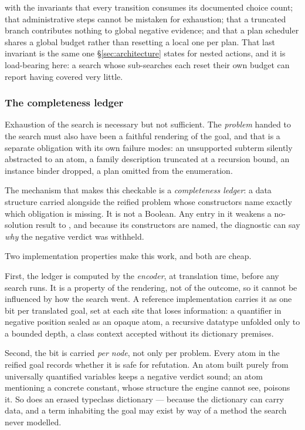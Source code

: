 with the invariants that every transition consumes its documented choice count;
that administrative steps cannot be mistaken for exhaustion; that a truncated
branch contributes nothing to global negative evidence; and that a plan
scheduler shares a global budget rather than resetting a local one per plan.
That last invariant is the same one \S\ref{sec:architecture} states for nested
actions, and it is load-bearing here: a search whose sub-searches each reset
their own budget can report  having covered very little.

\subsubsection*{The completeness ledger}

Exhaustion of the search is necessary but not sufficient. The \emph{problem}
handed to the search must also have been a faithful rendering of the goal, and
that is a separate obligation with its own failure modes: an unsupported
subterm silently abstracted to an atom, a family description truncated at a
recursion bound, an instance binder dropped, a plan omitted from the
enumeration.

The mechanism that makes this checkable is a \emph{completeness ledger}: a data
structure carried alongside the reified problem whose constructors name exactly
which obligation is missing. It is not a Boolean. Any entry in it weakens a
no-solution result to \unknown{}, and because its constructors are named, the
diagnostic can say \emph{why} the negative verdict was withheld.

Two implementation properties make this work, and both are cheap.

First, the ledger is computed by the \emph{encoder}, at translation time,
before any search runs. It is a property of the rendering, not of the outcome,
so it cannot be influenced by how the search went. A reference implementation
carries it as one bit per translated goal, set at each site that loses
information: a quantifier in negative position sealed as an opaque atom, a
recursive datatype unfolded only to a bounded depth, a class context accepted
without its dictionary premises.

Second, the bit is carried \emph{per node}, not only per problem. Every atom in
the reified goal records whether it is safe for refutation. An atom built
purely from universally quantified variables keeps a negative verdict sound; an
atom mentioning a concrete constant, whose structure the engine cannot see,
poisons it. So does an erased typeclass dictionary --- because the dictionary
can carry data, and a term inhabiting the goal may exist by way of a method the
search never modelled.


